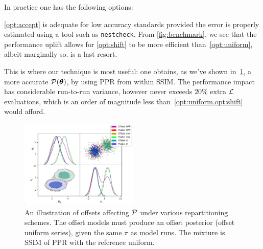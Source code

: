 \documentclass[usenatbib]{mnras}
\begin{document}
In practice one has the following options:
\vref{opt:accept} is adequate for low accuracy standards provided the
error is properly estimated using a tool such as \texttt{nestcheck}.
From \cref{fig:benchmark}, we see that the performance uplift allows
for \cref{opt:shift} to be more efficient than~\ref{opt:uniform},
albeit marginally so.  is a last resort.

This is where our technique is most useful: one obtains, as we've
shown in~\cref{fig:convergence}, a more accurate
\({\cal P}(\bm{\theta})\), by using PPR from within SSIM. The
performance impact has considerable run-to-run variance, however never
exceeds \(20\%\) extra \({\cal L}\) evaluations, which is an order of
magnitude less than~\vref{opt:uniform,opt:shift} would afford.

\begin{figure}
\includegraphics[width=0.5\textwidth]{./illustrations/convergence.pdf}
\caption{An illustration of offsets affecting ${\cal P}$ under various
  repartitioning schemes. The offset models must produce an offset
  posterior (offset uniform series), given the same $\pi$ as model
  runs. The mixture is SSIM of PPR with the reference
  uniform.\label{fig:convergence}}
\end{figure}
\end{document}
